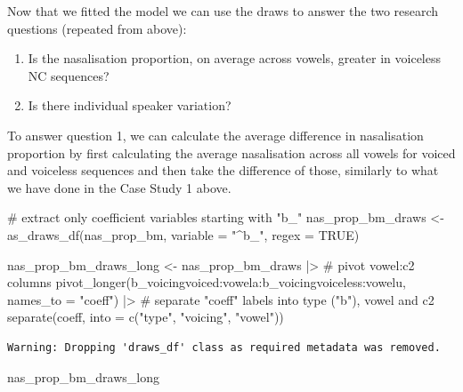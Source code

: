 \documentclass[
  authoryear,
  preprint,
  3p]{elsarticle}
\newenvironment{Shaded}{\begin{snugshade}}{\end{snugshade}}
\newcommand{\AttributeTok}[1]{\textcolor[rgb]{0.40,0.45,0.13}{#1}}
\newcommand{\CommentTok}[1]{\textcolor[rgb]{0.37,0.37,0.37}{#1}}
\newcommand{\ConstantTok}[1]{\textcolor[rgb]{0.56,0.35,0.01}{#1}}
\newcommand{\FunctionTok}[1]{\textcolor[rgb]{0.28,0.35,0.67}{#1}}
\newcommand{\NormalTok}[1]{\textcolor[rgb]{0.00,0.23,0.31}{#1}}
\newcommand{\OtherTok}[1]{\textcolor[rgb]{0.00,0.23,0.31}{#1}}
\newcommand{\SpecialCharTok}[1]{\textcolor[rgb]{0.37,0.37,0.37}{#1}}
\newcommand{\StringTok}[1]{\textcolor[rgb]{0.13,0.47,0.30}{#1}}
\providecommand{\tightlist}{%
  \setlength{\itemsep}{0pt}\setlength{\parskip}{0pt}}\usepackage{longtable,booktabs,array}
\begin{document}
Now that we fitted the model we can use the draws to answer the two
research questions (repeated from above):

\begin{enumerate}
\def\labelenumi{\arabic{enumi}.}
\tightlist
\item
  Is the nasalisation proportion, on average across vowels, greater in
  voiceless NC sequences?
\item
  Is there individual speaker variation?
\end{enumerate}

To answer question 1, we can calculate the average difference in
nasalisation proportion by first calculating the average nasalisation
across all vowels for voiced and voiceless sequences and then take the
difference of those, similarly to what we have done in the Case Study 1
above.

\begin{Shaded}
\begin{Highlighting}[]
\CommentTok{\# extract only coefficient variables starting with "b\_"}
\NormalTok{nas\_prop\_bm\_draws }\OtherTok{\textless{}{-}} \FunctionTok{as\_draws\_df}\NormalTok{(nas\_prop\_bm, }\AttributeTok{variable =} \StringTok{"\^{}b\_"}\NormalTok{, }\AttributeTok{regex =} \ConstantTok{TRUE}\NormalTok{)}

\NormalTok{nas\_prop\_bm\_draws\_long }\OtherTok{\textless{}{-}}\NormalTok{ nas\_prop\_bm\_draws }\SpecialCharTok{|\textgreater{}} 
  \CommentTok{\# pivot vowel:c2 columns}
  \FunctionTok{pivot\_longer}\NormalTok{(}\StringTok{\textasciigrave{}}\AttributeTok{b\_voicingvoiced:vowela}\StringTok{\textasciigrave{}}\SpecialCharTok{:}\StringTok{\textasciigrave{}}\AttributeTok{b\_voicingvoiceless:vowelu}\StringTok{\textasciigrave{}}\NormalTok{, }\AttributeTok{names\_to =} \StringTok{"coeff"}\NormalTok{) }\SpecialCharTok{|\textgreater{}}
  \CommentTok{\# separate "coeff" labels into type ("b"), vowel and c2}
  \FunctionTok{separate}\NormalTok{(coeff, }\AttributeTok{into =} \FunctionTok{c}\NormalTok{(}\StringTok{"type"}\NormalTok{, }\StringTok{"voicing"}\NormalTok{, }\StringTok{"vowel"}\NormalTok{))}
\end{Highlighting}
\end{Shaded}

\begin{verbatim}
Warning: Dropping 'draws_df' class as required metadata was removed.
\end{verbatim}

\begin{Shaded}
\begin{Highlighting}[]
\NormalTok{nas\_prop\_bm\_draws\_long}
\end{Highlighting}
\end{Shaded}
\end{document}
